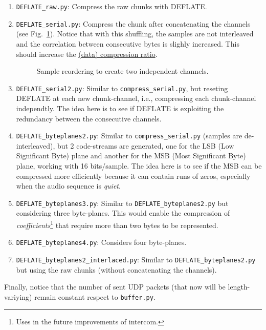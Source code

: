 \begin{enumerate}
\item \verb|DEFLATE_raw.py|: Compress the raw chunks with DEFLATE.
\item \verb|DEFLATE_serial.py|: Compress the chunk after concatenating
  the channels (see Fig.~\ref{fig:reordering}). Notice that with this
  shuffling, the samples are not interleaved and the correlation
  between consecutive bytes is slighly increased. This should increase
  the
  \href{https://en.wikipedia.org/wiki/Data_compression_ratio}{(data)
    compression ratio}.
\begin{figure}
  \begin{center}
  \end{center}
  \caption{Sample reordering to create two independent channels.}
  \label{fig:reordering}
\end{figure}
\item \verb|DEFLATE_serial2.py|: Similar to \verb|compress_serial.py|, but
  reseting DEFLATE at each new chunk-channel, i.e., compressing each
  chunk-channel independtly. The idea here is to see if DEFLATE is
  exploiting the redundancy between the consecutive channels.
\item \verb|DEFLATE_byteplanes2.py|: Similar to
  \verb|compress_serial.py| (samples are de-interleaved), but 2
  code-streams are generated, one for the LSB (Low Significant Byte)
  plane and another for the MSB (Most Significant Byte) plane, working
  with 16 bits/sample. The idea here is to see if the MSB can be
  compressed more efficiently because it can contain runs of zeros,
  especially when the audio sequence is \emph{quiet}.
\item \verb|DEFLATE_byteplanes3.py|: Similar to
  \verb|DEFLATE_byteplanes2.py| but considering three
  byte-planes. This would enable the compression of
  \emph{coefficients}\footnote{Uses in the future improvements of
    intercom.} that require more than two bytes to be represented.
\item \verb|DEFLATE_byteplanes4.py|: Considers four byte-planes.
\item \verb|DEFLATE_byteplanes2_interlaced.py|: Similar to
  \verb|DEFLATE_byteplanes2.py| but using the raw chunks (without
  concatenating the channels).
\end{enumerate}

Finally, notice that the number of sent UDP packets (that now will be
length-variying) remain constant respect to \verb|buffer.py|.


